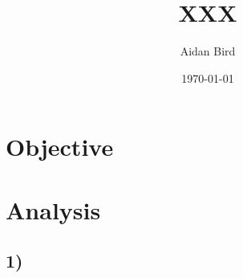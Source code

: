 \documentclass[10pt,a4paper]{article}
\newcommand{\projectroot}{/XXX}
\begin{document}
\title{XXX}
\author{Aidan Bird}
\date{\autodate\today}
\maketitle
{}
{}


\newpage

\section*{Objective} 

\section*{Analysis} 

\subsection*{1)}

%         

\FloatBarrier

\end{document}
